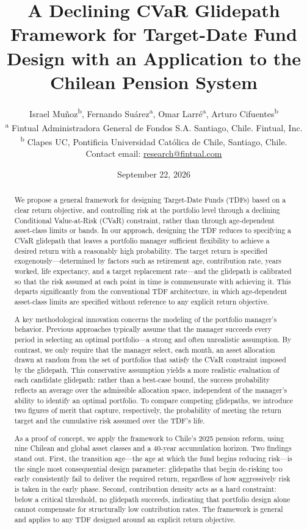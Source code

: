 \documentclass[11pt]{article}
\title{A Declining CVaR Glidepath Framework for Target-Date Fund Design with an Application to the Chilean Pension System}
\author{%
Israel Muñoz\textsuperscript{b}, Fernando Suárez\textsuperscript{a}, Omar Larré\textsuperscript{a}, Arturo Cifuentes\textsuperscript{b}\\[0.5em]
\small \textsuperscript{a} Fintual Administradora General de Fondos S.A. Santiago, Chile. Fintual, Inc.\\
\small \textsuperscript{b} Clapes UC, Pontificia Universidad Católica de Chile, Santiago, Chile.\\
\small Contact email: \href{mailto:research@fintual.com}{research@fintual.com}
}
\date{September 22, 2026}
\begin{document}
\maketitle

\begin{abstract}
We propose a general framework for designing Target-Date Funds (TDFs) based on a 
clear return objective, and controlling risk at the portfolio level through a 
declining Conditional Value-at-Risk (CVaR) constraint,  rather than through 
age-dependent asset-class limits or bands. In our approach, designing the 
TDF reduces to specifying a CVaR glidepath that leaves a portfolio manager 
sufficient flexibility to achieve a desired return with a reasonably high 
probability. The target return is specified  exogenously---determined  by 
factors such as retirement age, contribution rate, years worked, life 
expectancy, and a target replacement rate---and the glidepath is 
calibrated so that the risk assumed at each point in time is commensurate 
with achieving it. This departs significantly from the conventional TDF 
architecture, in which age-dependent asset-class limits are specified 
without reference to any explicit return objective.

A key methodological innovation concerns the modeling of the portfolio 
manager's behavior. Previous approaches typically assume that the manager 
succeeds every period in selecting an optimal portfolio---a strong and 
often unrealistic assumption. By contrast, we only require that the 
manager select, each month, an asset allocation drawn at random from the 
set of portfolios that satisfy the CVaR constraint imposed by the 
glidepath. This conservative assumption yields a more realistic evaluation 
of each candidate glidepath: rather than a best-case bound, the success 
probability reflects an average over the admissible allocation space, 
independent of the manager's ability to identify an optimal portfolio. 
To compare competing glidepaths, we introduce two figures of merit that 
capture, respectively, the probability of meeting the return target and 
the cumulative risk assumed over the TDF's life.

As a proof of concept, we apply the framework to Chile's 2025 pension 
reform, using nine Chilean and global asset classes and a 40-year 
accumulation horizon. Two findings stand out. First, the transition 
age---the age at which the fund begins reducing risk---is the single most 
consequential design parameter: glidepaths that begin de-risking too early 
consistently fail to deliver the required return, regardless of how 
aggressively risk is taken in the early phase. Second, contribution 
density acts as a hard constraint: below a critical threshold, no 
glidepath succeeds, indicating that portfolio design alone cannot 
compensate for structurally low contribution rates. The framework is 
general and applies to any TDF designed around an explicit return 
objective.




\end{abstract}
\end{document}
